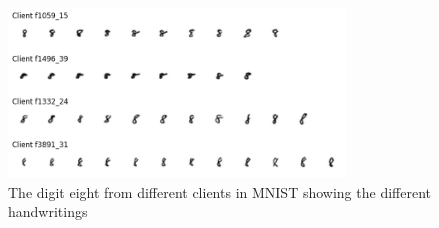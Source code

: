 \begin{figure}[tb]
	\centering
	\includegraphics[width=0.8\textwidth]{Bilder/emnist_feature_distribution_skew.png}
	\caption{The digit eight from different clients in MNIST showing the different handwritings}
	\label{fig:emnist-feature-skew}
\end{figure}

